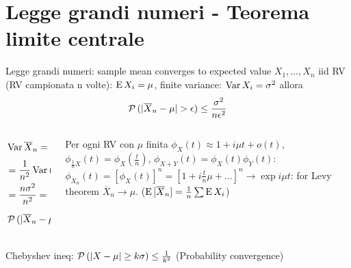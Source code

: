\documentclass[asd-beamer.tex]{subfiles}
\begin{document}
\section{Legge grandi numeri - Teorema limite centrale}

\begin{frame}{Legge grandi numeri: sample mean converges to expected value}
$X_1,\ldots,X_n$ iid RV (RV campionata n volte): $\operatorname{E}{X_i}=\mu$, finite variance: $\operatorname{Var}{X_i}=\sigma^2$ allora \[\prob{(|\overline{X}_n-\mu|>\epsilon)}\leq\frac{\sigma^2}{n\epsilon^2}\]
    \begin{columns}
    \begin{column}{0.4\textwidth}
\begin{align*}
&\var{\overline{X}_n}=\var{\frac{1}{n}(X_1+\ldots+X_n)}\\
&=\frac{1}{n^2}\var{(X_1+\ldots+X_n)}\\
&=\frac{n\sigma^2}{n^2}=\frac{\sigma^2}{n}\\
&\prob{(|\overline{X}_n-\mu|>\epsilon)}\leq\frac{\sigma^2}{n\epsilon^2}
\end{align*}
    \end{column}
    \begin{column}{0.6\textwidth}
Per ogni RV con $\mu$ finita 
$\phi_X(t)\approx1+i\mu t+o(t)$,$\phi_{\frac{1}{n}X}(t)=\phi_X(\frac{t}{n})$, $\phi_{X+Y}(t)=\phi_X(t)\phi_Y(t)$:
$\phi_{\overline{X}_n}(t)=[\phi_X(t)]^n=[1+i\frac{t}{n}\mu+\ldots]^n\to\exp{i\mu t}$: for Levy theorem $\overline{X}_n\to\mu$. ($\operatorname{E}{[\overline{X}_n]}=\frac{1}{n}\sum\operatorname{E}{X_i}$)
    \end{column}
    \end{columns}
Chebyshev ineq: $\operatorname{\mathcal{P}}{(|X-\mu|\geq k\sigma)}\leq\frac{1}{k^2}$ (Probability convergence)
\end{frame}
\end{document}
